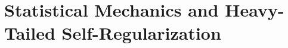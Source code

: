 \documentclass{article}
\newcommand{\michael}[1]{{\color{red}\sf{[Michael: #1]}}}
\begin{document}


\section*{Statistical Mechanics and Heavy-Tailed Self-Regularization}

%
%
%
%
\end{document}
